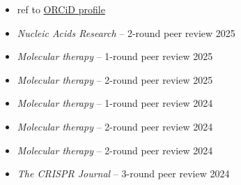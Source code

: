 






% 





\begin{itemize}
    \item[] \hfill ref to \href{https://orcid.org/0000-0002-4934-4731}{ORCiD profile}
    \item \textit{Nucleic Acids Research} -- 2-round peer review \hfill 2025
    \item \textit{Molecular therapy} -- 1-round peer review \hfill 2025
    \item \textit{Molecular therapy} -- 2-round peer review \hfill 2025
    \item \textit{Molecular therapy} -- 1-round peer review \hfill 2024
    \item \textit{Molecular therapy} -- 2-round peer review \hfill 2024
    \item \textit{Molecular therapy} -- 2-round peer review \hfill 2024
    \item \textit{The CRISPR Journal} -- 3-round peer review \hfill 2024
\end{itemize}


